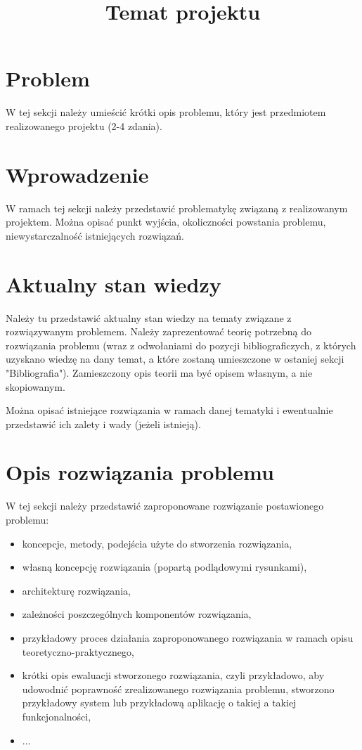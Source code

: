 \documentclass{classrep}
\author{
  \studentinfo{Autor 1}{nr albumu 1} \and
  \studentinfo{Autor 2}{nr albumu 2} \and
  \studentinfo{Autor 3}{nr albumu 3} \and
  \studentinfo{Autor 4}{nr albumu 4} \and
  \studentinfo{Autor 5}{nr albumu 5}
}
\title{Temat projektu}
\begin{document}
\maketitle

\section{Problem}

W tej sekcji należy umieścić krótki opis problemu, który jest przedmiotem realizowanego projektu (2-4 zdania).


\section{Wprowadzenie}

W ramach tej sekcji należy przedstawić problematykę związaną z realizowanym projektem. Można opisać punkt wyjścia, okoliczności powstania problemu, niewystarczalność istniejących rozwiązań.


\section{Aktualny stan wiedzy}

Należy tu przedstawić aktualny stan wiedzy na tematy związane z rozwiązywanym problemem. Należy zaprezentować teorię potrzebną do rozwiązania problemu (wraz z odwołaniami do pozycji bibliograficzych, z których uzyskano wiedzę na dany temat, a które zostaną umieszczone w ostaniej sekcji "Bibliografia"). Zamieszczony opis teorii ma być opisem własnym, a nie skopiowanym.

Można opisać istniejące rozwiązania w ramach danej tematyki i ewentualnie przedstawić ich zalety i wady (jeżeli istnieją).


\section{Opis rozwiązania problemu}

W tej sekcji należy przedstawić zaproponowane rozwiązanie postawionego problemu:
\begin{itemize}
\item koncepcje, metody, podejścia użyte do stworzenia rozwiązania,
\item własną koncepcję rozwiązania (popartą podlądowymi rysunkami),
\item architekturę rozwiązania,
\item zależności poszczególnych komponentów rozwiązania,
\item przykładowy proces działania zaproponowanego rozwiązania w ramach opisu teoretyczno-praktycznego,
\item krótki opis ewaluacji stworzonego rozwiązania, czyli przykładowo, aby udowodnić poprawność zrealizowanego rozwiązania problemu, stworzono przykładowy system lub przykładową aplikację o takiej a takiej funkcjonalności,
\item ...
\end{itemize}
\end{document}
